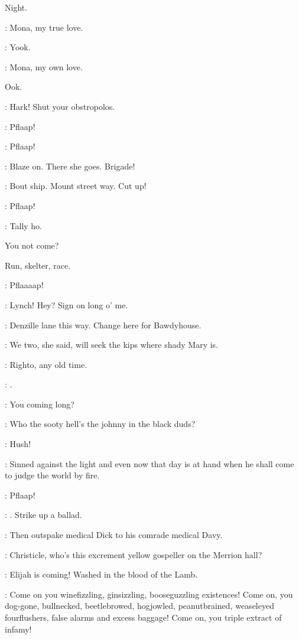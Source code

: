 Night.

\crotthers: Mona, my true love.

\lynch: Yook.

\crotthers: Mona, my own love.

Ook.


\lynch: Hark!
Shut your obstropolos.

: Pflaap!

: Pflaap!

\lenehan: Blaze on.
There she goes.
Brigade!

\punch: Bout ship.
Mount street way.
Cut up!

: Pflaap!

\lynch: Tally ho.

You not come?

Run, skelter, race.

: Pflaaaap!


\stephen: Lynch!
Hey?
Sign on long o' me.

\lynch: Denzille lane this way.
Change here for Bawdyhouse.

\stephen: We two, she said, will seek the kips where shady Mary is.

\lynch: Righto, any old time.

\stephen: .

\lynch: You coming long?

\stephen: Who the sooty hell's the johnny in the black duds?

\lynch: Hush!

\dowie: Sinned against the light and even now that day is at hand
when he shall come to judge the world by fire.

: Pflaap!

\stephen: .
Strike up a ballad.

: Then outspake medical Dick to his comrade medical Davy.

\bystander: Christicle, who's this excrement yellow gospeller on the Merrion hall?

\dowie: Elijah is coming! Washed in the blood of the Lamb.

\dowie: Come on you winefizzling, ginsizzling, booseguzzling existences!
Come on, you dog-gone, bullnecked, beetlebrowed, hogjowled,
peanutbrained, weaseleyed fourflushers, false alarms and excess baggage!
Come on, you triple extract of infamy!

